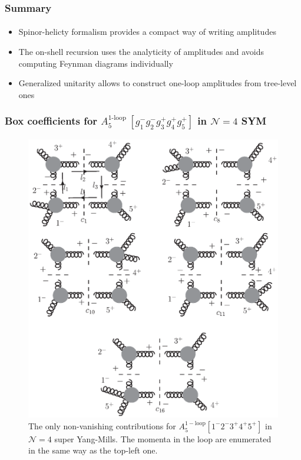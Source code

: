 \documentclass[english]{beamer}
\begin{document}
\begin{frame}
\frametitle{Summary}
\framesubtitle{}
\begin{itemize}
\item<1-> Spinor-helicty formalism provides a compact way of writing amplitudes
\item<2-> The on-shell recursion uses the analyticity of amplitudes and avoids computing Feynman diagrams individually
\item<3-> Generalized unitarity allows to construct one-loop amplitudes from tree-level ones

\end{itemize}

\end{frame}

\appendix

\begin{frame}[shrink=20]
\frametitle{Box coefficients for $A_5^{\textrm{1-loop }}[g_1^-g_2^-g_3^+g_4^+g_5^+]$ in  $\mathcal{N}=4$ SYM}

\begin{figure}
  \centering
  \includegraphics[width=0.8\linewidth]{A5mhv.eps}
  \caption{The only non-vanishing contributions for $A_5^{\mathrm{1-loop}}[1^-2^-3^+4^+5^+]$ in $\mathcal{N}=4$ super Yang-Mills. The momenta in the loop are enumerated in the same way as the top-left one.}
  \label{fig-a5mhv}
\end{figure}

\end{frame}
\end{document}
